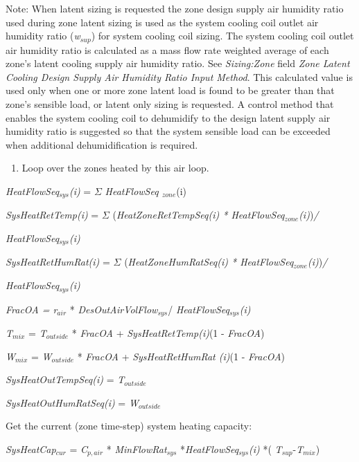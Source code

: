 Note: When latent sizing is requested the zone design supply air humidity ratio used during zone latent sizing is used as the system cooling coil outlet air humidity ratio (\emph{w\(_{sup}\)}) for system cooling coil sizing. The system cooling coil outlet air humidity ratio is calculated as a mass flow rate weighted average of each zone's latent cooling supply air humidity ratio. See \emph{Sizing:Zone} field \emph{Zone Latent Cooling Design Supply Air Humidity Ratio Input Method}. This calculated value is used only when one or more zone latent load is found to be greater than that zone's sensible load, or latent only sizing is requested. A control method that enables the system cooling coil to dehumidify to the design latent supply air humidity ratio is suggested so that the system sensible load can be exceeded when additional dehumidification is required.


\begin{enumerate}
\def\labelenumi{(\arabic{enumi})}
\setcounter{enumi}{1}
\tightlist
\item
  Loop over the zones heated by this air loop.
\end{enumerate}

\emph{HeatFlowSeq\(_{sys}\)(i)} = $\Sigma$ \emph{HeatFlowSeq \(_{zone}\)}(i)

\emph{SysHeatRetTemp(i)} = $\Sigma$ (\emph{HeatZoneRetTempSeq(i) * HeatFlowSeq\(_{zone}\)(i)})\emph{/}

\emph{HeatFlowSeq\(_{sys}\)(i)}

\emph{SysHeatRetHumRat(i)} = $\Sigma$ (\emph{HeatZoneHumRatSeq(i) * HeatFlowSeq\(_{zone}\)(i)})\emph{/}

\emph{HeatFlowSeq\(_{sys}\)(i)}

\emph{FracOA = r\(_{air}\)} * \emph{DesOutAirVolFlow\(_{sys}\)}/ \emph{HeatFlowSeq\(_{sys}\)(i)}

\emph{T\(_{mix}\)} = \emph{T\(_{outside}\)} * \emph{FracOA} + \emph{SysHeatRetTemp(i)}(1 - \emph{FracOA})

\emph{W\(_{mix}\)} = \emph{W\(_{outside}\)} * \emph{FracOA} + \emph{SysHeatRetHumRat (i)}(1 - \emph{FracOA})

\emph{SysHeatOutTempSeq(i)} = \emph{T\(_{outside}\)}

\emph{SysHeatOutHumRatSeq(i)} = \emph{W\(_{outside}\)}

Get the current (zone time-step) system heating capacity:

\emph{SysHeatCap\(_{cur}\)} = \emph{C\(_{p,air}\)} * \emph{MinFlowRat\(_{sys}\)} *\emph{HeatFlowSeq\(_{sys}\)(i)} *( \emph{T\(_{sup}\)}-\emph{T\(_{mix}\)})

